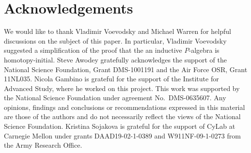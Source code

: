 \documentclass[10pt,a4paper,oneside,reqno]{amsart}
\theoremstyle{mythm}
\theoremstyle{mydef}
\theoremstyle{myrmk}
\begin{document}
\section*{Acknowledgements}

We would like to thank Vladimir Voevodsky and Michael Warren for helpful discussions
on the subject of this paper. In particular, Vladimir Voevodsky suggested a simplification of the 
proof that the an inductive $P$-algebra is homotopy-initial.
 Steve Awodey gratefully acknowledges the support of the National Science Foundation, Grant DMS-1001191 and the Air Force OSR, Grant 11NL035. Nicola Gambino is grateful for the support of the Institute for Advanced Study, where
he worked on this project. This work was supported by the National Science Foundation 
under agreement No.\ DMS-0635607. Any opinions, findings and conclusions or recommendations
expressed in this material are those of the authors and do not necessarily reflect the views of
the National Science Foundation. Kristina Sojakova is grateful for the support of CyLab at Carnegie
Mellon under grants DAAD19-02-1-0389 and W911NF-09-1-0273 from the Army
Research Office.











                        
\end{document}
